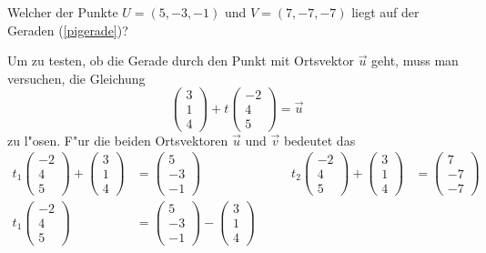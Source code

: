 \begin{beispiel} Welcher der Punkte $U=(5,-3,-1)$ und $V=(7,-7,-7)$
liegt auf der Geraden (\ref{pigerade})?

\smallskip

{\parindent 0pt Um zu testen},
ob die Gerade durch den Punkt mit Ortsvektor $\vec u$
geht, muss man versuchen, die Gleichung
\[
\begin{pmatrix}3\\1\\4 \end{pmatrix}
+t
\begin{pmatrix}-2\\4\\5\end{pmatrix}
=\vec u
\]
zu l"osen. F"ur die beiden Ortsvektoren $\vec u$ und $\vec v$
bedeutet das
\begin{align*}
t_1
\begin{pmatrix}-2\\4\\5\end{pmatrix}
+
\begin{pmatrix}3\\1\\4 \end{pmatrix}
&=
\begin{pmatrix}5\\-3\\-1\end{pmatrix}
&
\qquad
t_2
\begin{pmatrix}-2\\4\\5\end{pmatrix}
+
\begin{pmatrix}3\\1\\4 \end{pmatrix}
&=
\begin{pmatrix}7\\-7\\-7\end{pmatrix}
\\
t_1
\begin{pmatrix}-2\\4\\5\end{pmatrix}
&=
\begin{pmatrix}5\\-3\\-1\end{pmatrix}
-
\begin{pmatrix}3\\1\\4 \end{pmatrix}

\end{align*}
\end{beispiel}
